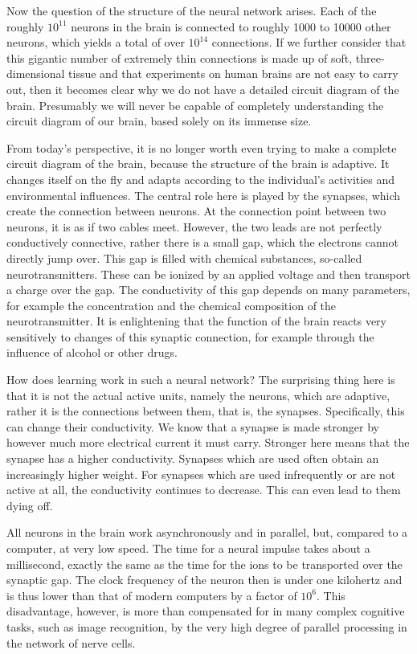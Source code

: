 \documentclass[10pt]{book}
\begin{document}
Now the question of the structure of the neural network arises. Each of the roughly $10^{11}$ neurons in the brain is connected to roughly 1000 to 10000 other neurons, which yields a total of over $10^{14}$ connections. If we further consider that this gigantic number of extremely thin connections is made up of soft, three-dimensional tissue and that experiments on human brains are not easy to carry out, then it becomes clear why we do not have a detailed circuit diagram of the\\
brain. Presumably we will never be capable of completely understanding the circuit diagram of our brain, based solely on its immense size.

From today's perspective, it is no longer worth even trying to make a complete circuit diagram of the brain, because the structure of the brain is adaptive. It changes itself on the fly and adapts according to the individual's activities and environmental influences. The central role here is played by the synapses, which create the connection between neurons. At the connection point between two neurons, it is as if two cables meet. However, the two leads are not perfectly conductively connective, rather there is a small gap, which the electrons cannot directly jump over. This gap is filled with chemical substances, so-called neurotransmitters. These can be ionized by an applied voltage and then transport a charge over the gap. The conductivity of this gap depends on many parameters, for example the concentration and the chemical composition of the neurotransmitter. It is enlightening that the function of the brain reacts very sensitively to changes of this synaptic connection, for example through the influence of alcohol or other drugs.

How does learning work in such a neural network? The surprising thing here is that it is not the actual active units, namely the neurons, which are adaptive, rather it is the connections between them, that is, the synapses. Specifically, this can change their conductivity. We know that a synapse is made stronger by however much more electrical current it must carry. Stronger here means that the synapse has a higher conductivity. Synapses which are used often obtain an increasingly higher weight. For synapses which are used infrequently or are not active at all, the conductivity continues to decrease. This can even lead to them dying off.

All neurons in the brain work asynchronously and in parallel, but, compared to a computer, at very low speed. The time for a neural impulse takes about a millisecond, exactly the same as the time for the ions to be transported over the synaptic gap. The clock frequency of the neuron then is under one kilohertz and is thus lower than that of modern computers by a factor of $10^{6}$. This disadvantage, however, is more than compensated for in many complex cognitive tasks, such as image recognition, by the very high degree of parallel processing in the network of nerve cells.
\end{document}
